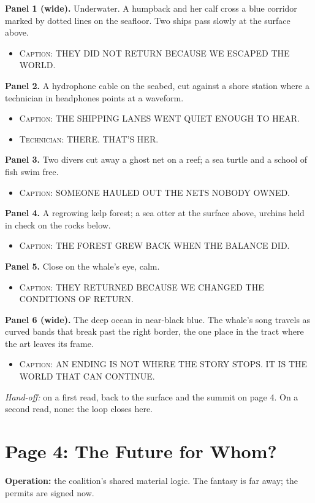 \documentclass[11pt]{article}
\newcommand{\op}[1]{\textbf{Operation:} #1\par}
\newcommand{\panel}[2]{\textbf{#1.} #2\par}
\newenvironment{lines}{\begin{itemize}[label={},leftmargin=1.5em,itemsep=0.05em,topsep=0.1em]}{\end{itemize}}
\newcommand{\say}[2]{\item \textsc{#1}: \textsf{\small #2}}
\newcommand{\handoff}[1]{\emph{Hand-off:} #1\par}
\begin{document}
\panel{Panel 1 (wide)}{Underwater. A humpback and her calf cross a blue corridor marked by dotted lines on the seafloor. Two ships pass slowly at the surface above.}
\begin{lines}\say{Caption}{THEY DID NOT RETURN BECAUSE WE ESCAPED THE WORLD.}\end{lines}

\panel{Panel 2}{A hydrophone cable on the seabed, cut against a shore station where a technician in headphones points at a waveform.}
\begin{lines}\say{Caption}{THE SHIPPING LANES WENT QUIET ENOUGH TO HEAR.}\say{Technician}{THERE. THAT'S HER.}\end{lines}

\panel{Panel 3}{Two divers cut away a ghost net on a reef; a sea turtle and a school of fish swim free.}
\begin{lines}\say{Caption}{SOMEONE HAULED OUT THE NETS NOBODY OWNED.}\end{lines}

\panel{Panel 4}{A regrowing kelp forest; a sea otter at the surface above, urchins held in check on the rocks below.}
\begin{lines}\say{Caption}{THE FOREST GREW BACK WHEN THE BALANCE DID.}\end{lines}

\panel{Panel 5}{Close on the whale's eye, calm.}
\begin{lines}\say{Caption}{THEY RETURNED BECAUSE WE CHANGED THE CONDITIONS OF RETURN.}\end{lines}

\panel{Panel 6 (wide)}{The deep ocean in near-black blue. The whale's song travels as curved bands that break past the right border, the one place in the tract where the art leaves its frame.}
\begin{lines}\say{Caption}{AN ENDING IS NOT WHERE THE STORY STOPS. IT IS THE WORLD THAT CAN CONTINUE.}\end{lines}

\handoff{on a first read, back to the surface and the summit on page 4. On a second read, none: the loop closes here.}

\section{Page 4: The Future for Whom?}

\op{the coalition's shared material logic. The fantasy is far away; the permits are signed now.}
\end{document}
